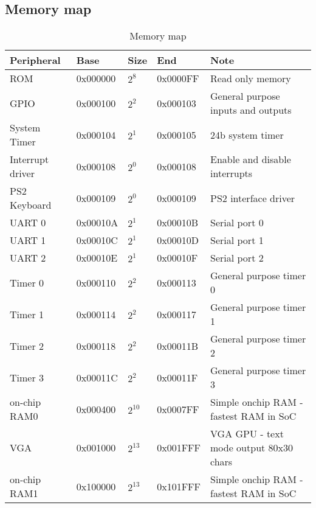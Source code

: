 \subsection{Memory map}

\begin{table}[]
    \centering
    \begin{tabular}{|l|l|l|l|l|}
        \hline
        \textbf{Peripheral} & \textbf{Base} & \textbf{Size} & \textbf{End} & \textbf{Note}                                  \\ \hline
        ROM                 & 0x000000      & $2^{8}$       & 0x0000FF     & Read only memory                               \\ \hline
        GPIO                & 0x000100      & $2^{2}$       & 0x000103     & General purpose inputs and outputs             \\ \hline
        System Timer        & 0x000104      & $2^{1}$       & 0x000105     & 24b system timer                               \\ \hline
        Interrupt driver    & 0x000108      & $2^{0}$       & 0x000108     & Enable and disable interrupts                  \\ \hline
        PS2 Keyboard        & 0x000109      & $2^{0}$       & 0x000109     & PS2 interface driver                           \\ \hline
        UART 0              & 0x00010A      & $2^{1}$       & 0x00010B     & Serial port 0                                  \\ \hline
        UART 1              & 0x00010C      & $2^{1}$       & 0x00010D     & Serial port 1                                  \\ \hline
        UART 2              & 0x00010E      & $2^{1}$       & 0x00010F     & Serial port 2                                  \\ \hline
        Timer 0             & 0x000110      & $2^{2}$       & 0x000113     & General purpose timer 0                        \\ \hline
        Timer 1             & 0x000114      & $2^{2}$       & 0x000117     & General purpose timer 1                        \\ \hline
        Timer 2             & 0x000118      & $2^{2}$       & 0x00011B     & General purpose timer 2                        \\ \hline
        Timer 3             & 0x00011C      & $2^{2}$       & 0x00011F     & General purpose timer 3                        \\ \hline
        on-chip RAM0        & 0x000400      & $2^{10}$      & 0x0007FF     & Simple onchip RAM - fastest RAM in SoC         \\ \hline
        VGA                 & 0x001000      & $2^{13}$      & 0x001FFF     & VGA GPU - text mode output 80x30 chars         \\ \hline
        on-chip RAM1        & 0x100000      & $2^{13}$      & 0x101FFF     & Simple onchip RAM - fastest RAM in SoC         \\ \hline
    \end{tabular}
    \caption{Memory map}
    \label{tab:memory_map}
\end{table}

